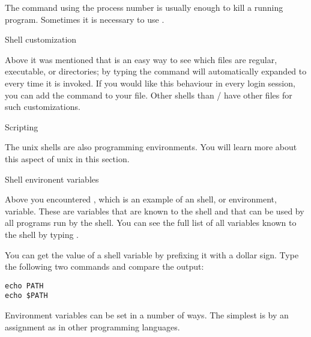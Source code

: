 {The command  using the process number is usually enough
  to kill a running program. Sometimes it is necessary to use .}{}

 {Shell customization}

Above it was mentioned that  is an easy way to see which
files are regular, executable, or directories; by typing  the  command will automatically expanded to  every time it is invoked. If you would like this behaviour in
every login session, you can add the  command to your
 file. Other shells than / have other files for such
customizations.

 {Scripting}
\label{sec:unix-script}

The unix shells are also programming environments. You will learn more
about this aspect of unix in this section.

 {Shell environent variables}
\label{tut:shellvars}

Above you encountered , which is an example of an
shell, or environment, variable. These are variables that are known to the shell
and that can be used by all programs run by the shell. You can see the
full list of all variables known to the shell by typing . 

You can get the value of a shell variable by prefixing it with
a dollar sign. Type the following two commands and compare the output:
\begin{verbatim}
echo PATH
echo $PATH
\end{verbatim}


Environment variables can be set in a number of ways. The simplest
is by an assignment as in other programming languages.

